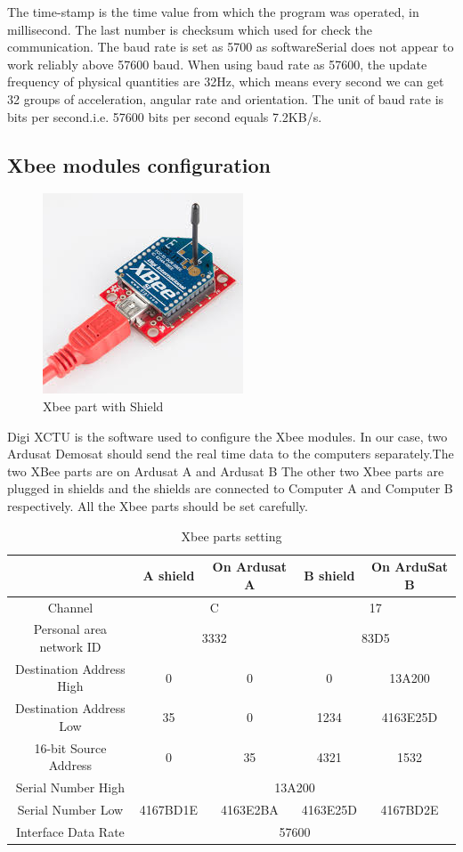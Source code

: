 The time-stamp is the time value from which the program was operated, in millisecond. The last number is checksum which used for check the communication.
The baud rate is set as 5700 as softwareSerial does not appear to work reliably above 57600 baud.\cite{ardusatsdk}
When using baud rate as 57600, the update frequency of physical quantities are 32Hz, which means every second we can get 32 groups of acceleration, angular rate and orientation. The unit of baud rate is bits per second.i.e. 57600 bits per second equals 7.2KB/s.

\subsection{Xbee modules configuration}
\begin{figure}[!h]
\centering
\includegraphics{fig/DOE/XbeeShield}
\caption{Xbee part with Shield}
\end{figure}
Digi XCTU\cite{DigiCite} is the software used to configure the Xbee modules. In our case, two Ardusat Demosat should send the real time data to the computers separately.The two XBee parts are on Ardusat A and Ardusat B The other two Xbee parts are plugged in shields and the shields are connected to Computer A and Computer B respectively. All the Xbee parts should be set carefully\cite{XbeeSetting}. 
\begin{table}[!h]
\renewcommand\arraystretch{2}
	\begin{center}
	\caption{Xbee parts setting}
	\begin{tabular}{|c|c|c|c|c|}
	\hline
	\backslashbox{\textbf{Setting}}{\textbf{Xbee part}} & \textbf{A shield} & \textbf{On Ardusat A} & \textbf{B shield} & \textbf{On ArduSat B}\\ \hline
	Channel & \multicolumn{2}{c|}{C} &\multicolumn{2}{c|}{17}  \\ \hline
	Personal area network ID & \multicolumn{2}{c|}{3332}& \multicolumn{2}{c|}{83D5}\\ \hline
	Destination Address High & 0 & 0 & 0 & 13A200\\ \hline
	Destination Address Low & 35 & 0 & 1234&4163E25D\\ \hline
	16-bit Source Address & 0 & 35 & 4321 & 1532\\ \hline
	Serial Number High & \multicolumn{4}{c|}{13A200}\\ \hline
	Serial Number Low & 4167BD1E & 4163E2BA & 4163E25D & 4167BD2E\\ \hline
	Interface Data Rate	 & \multicolumn{4}{c|}{57600}\\ \hline
	\end{tabular}	
	\end{center}
\end{table}
